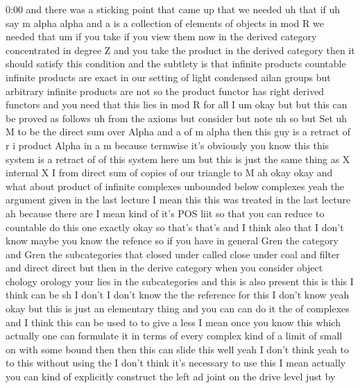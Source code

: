 \begin{unfinished}{0:00}
and  there  was  a  sticking  point  that  came
up  that  we  needed  uh  that  if  uh  say  m
alpha  alpha  and  a  is  a  collection  of
elements  of
objects  in  mod
R  we  needed
that  um  if  you  take  if  you  view  them  now
in  the  derived  category  concentrated  in
degree  Z  and  you  take  the  product  in  the
derived  category  then  it  should  satisfy
this  condition  and  the  subtlety  is  that
infinite  products  countable  infinite
products  are  exact  in  our  setting  of
light  condensed  ailan  groups  but
arbitrary  infinite  products  are  not  so
the  product  functor  has  right  derived
functors  and  you  need  that  this  lies  in
mod  R  for  all
I
um  okay  but  but  this  can  be  proved  as
follows  uh  from  the  axioms  but  consider
but  note  uh  so  but  Set  uh  M  to  be  the
direct  sum  over  Alpha  and  a  of  m
alpha  then  this  guy  is  a
retract
of  r  i  product  Alpha  in  a
m  because  termwise  it's  obviously  you
know  this  this  system  is  a  retract  of  of
this  system  here  um  but  this  is  just  the
same  thing  as  X  internal  X
I  from  direct  sum  of
copies  of  our  triangle  to
M  ah  okay
okay  and  what  about  product  of  infinite
complexes  unbounded  below  complexes  yeah
the  argument  given  in  the  last  lecture  I
mean  this  this  was  treated  in  the  last
lecture  ah  because  there  are  I  mean  kind
of  it's  POS  liit  so  that  you  can  reduce
to  countable  do  this  one
exactly  okay  so  that's  that's  and  I
think  also  that  I  don't  know  maybe  you
know  the  refence  so  if  you  have  in
general  Gren  the  category  and  Gren  the
subcategories  that  closed
under  called  close  under  coal  and  filter
and  direct  direct  but  then  in  the  derive
category  when  you  consider  object
chology  orology  your  lies  in  the
subcategories  and  this  is  also
present  this  is  this  I  think  can  be  sh  I
don't  I  don't  know  the  the  reference  for
this  I  don't  know  yeah  okay  but  this  is
just  an  elementary  thing  and  you  can  can
do  it  the  of  complexes  and  I  think  this
can  be  used  to  to  give  a  less  I  mean
once  you  know  this  which  actually  one
can  formulate  it  in  terms  of  every
complex  kind  of  a  limit  of  small  on  with
some
bound  then  then  this  can  slide  this  well
yeah  I  don't  think  yeah  to  to  this
without  using  the  I  don't  think  it's
necessary  to  use  this  I  mean  actually
you  can  kind  of  explicitly  construct  the
left  ad  joint  on  the  drive  level  just  by

\end{unfinished}
